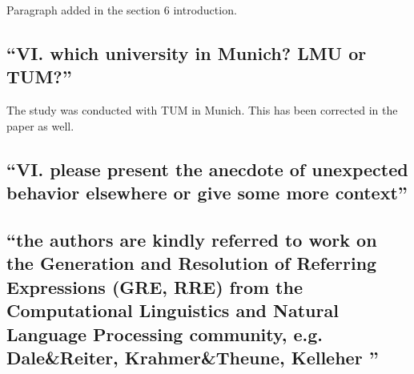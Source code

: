 \documentclass{article}
\begin{document}
Paragraph added in the section 6 introduction.

\subsection{``VI. which university in Munich? LMU or TUM?''}

The study was conducted with TUM in Munich. This has been corrected in 
the paper as well.

\subsection{``VI. please present the anecdote of unexpected behavior elsewhere
or give some more context''}

\subsection{``the authors are kindly referred to work on the Generation and
Resolution of Referring Expressions (GRE, RRE) from the Computational
Linguistics and Natural Language Processing community, e.g. Dale\&Reiter,
Krahmer\&Theune, Kelleher ''}
\end{document}
